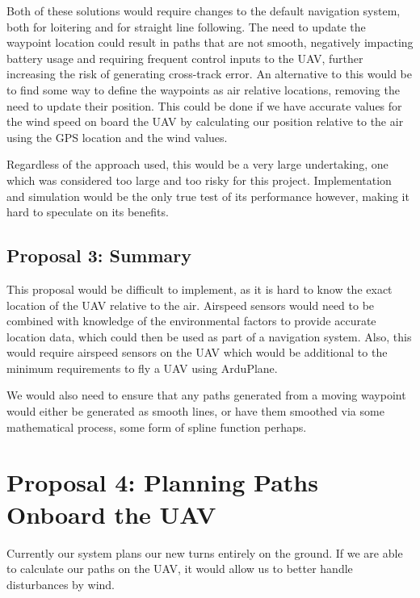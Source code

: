 Both of these solutions would require changes to the default navigation system, both for loitering and for straight line following. The need to update the waypoint location could result in paths that are not smooth, negatively impacting battery usage and requiring frequent control inputs to the UAV, further increasing the risk of generating cross-track error. An alternative to this would be to find some way to define the waypoints as air relative locations, removing the need to update their position. This could be done if we have accurate values for the wind speed on board the UAV by calculating our position relative to the air using the GPS location and the wind values. 

Regardless of the approach used, this would be a very large undertaking, one which was considered too large and too risky for this project. Implementation and simulation would be the only true test of its performance however, making it hard to speculate on its benefits.

\subsection{Proposal 3: Summary} 
\label{future:alternatedubinssummary}

This proposal would be difficult to implement, as it is hard to know the exact location of the UAV relative to the air. Airspeed sensors would need to be combined with knowledge of the environmental factors to provide accurate location data, which could then be used as part of a navigation system. Also, this would require airspeed sensors on the UAV which would be additional to the minimum requirements to fly a UAV using ArduPlane.

We would also need to ensure that any paths generated from a moving waypoint would either be generated as smooth lines, or have them smoothed via some mathematical process, some form of spline function perhaps.

\section{Proposal 4: Planning Paths Onboard the UAV} 
\label{future:onboard}

Currently our system plans our new turns entirely on the ground. If we are able to calculate our paths on the UAV, it would allow us to better handle disturbances by wind.


